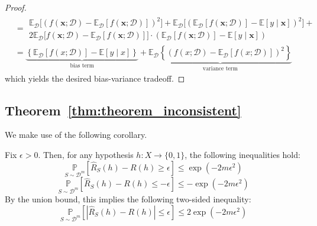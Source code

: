 \documentclass[10pt]{article}
\begin{document}
\begin{proof}
\begin{equation}
\begin{split}
            & = \begin{multlined}
                \mathbb{E}_{\mathcal{D}} \Big[(f(\mathbf{x};\mathcal{D})-\mathbb{E}_{\mathcal{D}}[f(\mathbf{x};\mathcal{D})])^{2}\Big] + \mathbb{E}_{\mathcal{D}} \Big[ (\mathbb{E}_{\mathcal{D}} [f(\mathbf{x};\mathcal{D})] - \mathbb{E}[y\mid \mathbf{x}])^{2} \Big] + \\2\mathbb{E}_{\mathcal{D}}\Big[f(\mathbf{x};\mathcal{D})-\mathbb{E}_{\mathcal{D}}[f(\mathbf{x};\mathcal{D})]\Big]\cdot (\mathbb{E}_{\mathcal{D}}[f(\mathbf{x};\mathcal{D})]-\mathbb{E}[y\mid \mathbf{x}])
            \end{multlined} \\
            & = \underbrace{\left\{ \mathbb{E}_{\mathcal{D}}[f(x;\mathcal{D})] - \mathbb{E}[y\mid x] \right\}}_{\text{bias term}} + \underbrace{\mathbb{E}_{\mathcal{D}} \left\{(f(x;\mathcal{D})- \mathbb{E}_{\mathcal{D}}[f(x;\mathcal{D})])^{2}\right\}}_{\text{variance term}}
        \end{split}
    \end{equation}
    which yields the desired bias-variance tradeoff. 
\end{proof}

\subsection{Theorem~\ref{thm:theorem_inconsistent}}

We make use of the following corollary. 

\begin{col}
    Fix $\epsilon > 0$. Then, for any hypothesis $h: X \to \{0,1\}$, the following inequalities hold: 
    \begin{equation}
        \underset{S\sim \mathcal{D}^m}{\mathbb{P}} \left[\hat{R}_S (h) - R(h) \geq \epsilon\right] \leq \exp{(-2m\epsilon^2)}
    \end{equation}
    \begin{equation}
        \underset{S\sim \mathcal{D}^m}{\mathbb{P}} \left[\hat{R}_S (h) - R(h) \leq -\epsilon\right] \leq -\exp{(-2m\epsilon^2)}
    \end{equation}
    By the union bound, this implies the following two-sided inequality: 
    \begin{equation}
        \underset{S\sim \mathcal{D}^m}{\mathbb{P}} \left[|\hat{R}_S (h) - R(h)| \leq \epsilon\right] \leq 2\exp{(-2m\epsilon^2)}
    \end{equation}
\end{col}
\end{document}
